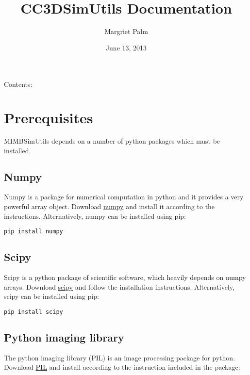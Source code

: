 \documentclass[letterpaper,10pt,english]{sphinxmanual}
\title{CC3DSimUtils Documentation}
\date{June 13, 2013}
\author{Margriet Palm}
\begin{document}
\maketitle
\tableofcontents
{}\label{CC3DSimUtils::doc}


Contents:


\chapter{Prerequisites}
\label{Preq:prerequisites}\label{Preq::doc}\label{Preq:welcome-to-cc3dsimutils-documentation}
MIMBSimUtils depends on a number of python packages which must be installed.


\section{Numpy}
\label{Preq:numpy}
Numpy is a package for numerical computation in python and it provides a very powerful array object. Download \href{http://sourceforge.net/projects/numpy/files/}{numpy} and install it according to the instructions. Alternatively, numpy can be installed using pip:

\begin{Verbatim}[commandchars=\\\{\}]
pip install numpy
\end{Verbatim}


\section{Scipy}
\label{Preq:scipy}
Scipy is a python package of scientific software, which heavily depends on numpy arrays. Download \href{http://sourceforge.net/projects/scipy/files/}{scipy} and follow the installation instructions. Alternatively, scipy can be installed using pip:

\begin{Verbatim}[commandchars=\\\{\}]
pip install scipy
\end{Verbatim}


\section{Python imaging library}
\label{Preq:python-imaging-library}
The python imaging library (PIL) is an image processing package for python. Download \href{http://www.pythonware.com/products/pil/\#pil117}{PIL} and install according to the instruction included in the package:
\end{document}

